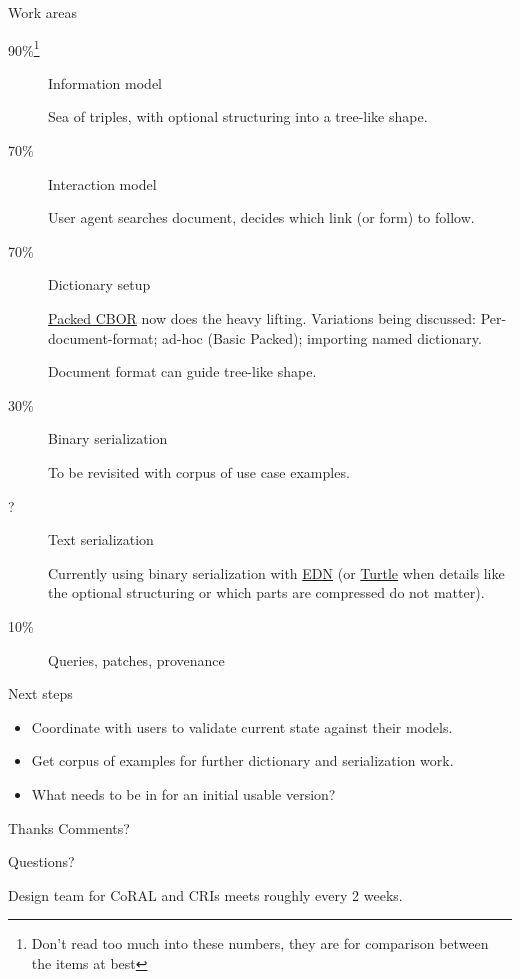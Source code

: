 \documentclass[aspectratio=169,colorlinks]{beamer}
\begin{document}
\begin{frame}{Work areas}\large
	\begin{description}
		\item[90\%\footnote{Don't read too much into these numbers, they are for comparison between the items at best}]
			Information model

			Sea of triples, with optional structuring into a tree-like shape.

		\item[70\%] Interaction model

			User agent searches document, decides which link (or form) to follow.

		\item[70\%] Dictionary setup

			\href{https://datatracker.ietf.org/doc/draft-ietf-cbor-packed/}{Packed CBOR} now does the heavy lifting.
			Variations being discussed: Per-document-format; ad-hoc (Basic Packed); importing named dictionary.

			Document format can guide tree-like shape.

		\item[30\%] Binary serialization

			To be revisited with corpus of use case examples.

		\item[?] Text serialization

			Currently using binary serialization with \href{https://datatracker.ietf.org/doc/draft-bormann-cbor-edn-literals/}{EDN}
			(or \href{https://en.wikipedia.org/wiki/Turtle_(syntax)}{Turtle} when details like the optional structuring or which parts are compressed do not matter).

		\item[10\%] Queries, patches, provenance
	\end{description}
\end{frame}

\begin{frame}{Next steps}\Large
	\begin{itemize}
		\item Coordinate with users to validate current state against their models.
		\item Get corpus of examples for further dictionary and serialization work.
		\item What needs to be in for an initial usable version?
	\end{itemize}
\end{frame}

\begin{frame}{Thanks}\Large
	Comments?

	\bigskip

	Questions?

	\vspace{2cm}

	Design team for CoRAL and CRIs meets roughly every 2 weeks.
\end{frame}
\end{document}
